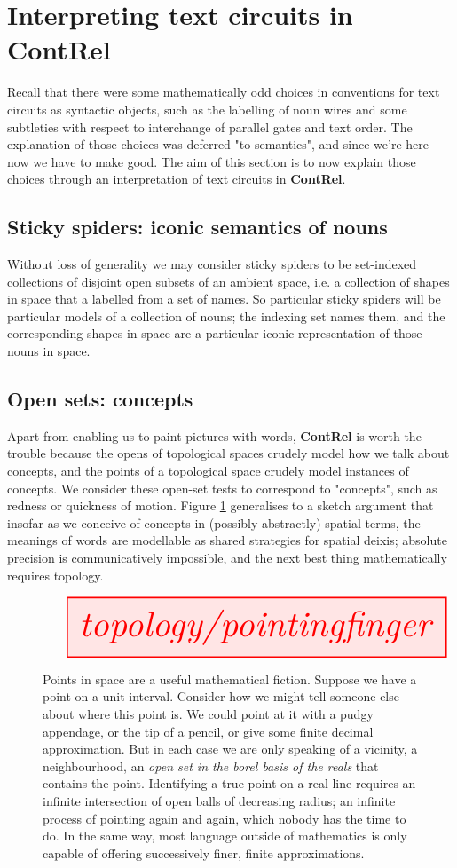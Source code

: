 \section{Interpreting text circuits in \textbf{ContRel}}\label{subsec:toptext}

Recall that there were some mathematically odd choices in conventions for text circuits as syntactic objects, such as the labelling of noun wires and some subtleties with respect to interchange of parallel gates and text order. The explanation of those choices was deferred "to semantics", and since we're here now we have to make good. The aim of this section is to now explain those choices through an interpretation of text circuits in \textbf{ContRel}.

\subsection{Sticky spiders: iconic semantics of nouns}
Without loss of generality we may consider sticky spiders to be set-indexed collections of disjoint open subsets of an ambient space, i.e. a collection of shapes in space that a labelled from a set of names. So particular sticky spiders will be particular models of a collection of nouns; the indexing set names them, and the corresponding shapes in space are a particular iconic representation of those nouns in space.

\subsection{Open sets: concepts}

Apart from enabling us to paint pictures with words, \textbf{ContRel} is worth the trouble because the opens of topological spaces crudely model how we talk about concepts, and the points of a topological space crudely model instances of concepts. We consider these open-set tests to correspond to "concepts", such as redness or quickness of motion. Figure \ref{fig:pointing} generalises to a sketch argument that insofar as we conceive of concepts in (possibly abstractly) spatial terms, the meanings of words are modellable as shared strategies for spatial deixis; absolute precision is communicatively impossible, and the next best thing mathematically requires topology.

\begin{figure}[h!]\label{fig:pointing}
\[\resizebox{\textwidth}{!}{\tikzfig{topology/pointingfinger}}\]
\caption{Points in space are a useful mathematical fiction. Suppose we have a point on a unit interval. Consider how we might tell someone else about where this point is. We could point at it with a pudgy appendage, or the tip of a pencil, or give some finite decimal approximation. But in each case we are only speaking of a vicinity, a neighbourhood, an \emph{open set in the borel basis of the reals} that contains the point. Identifying a true point on a real line requires an infinite intersection of open balls of decreasing radius; an infinite process of pointing again and again, which nobody has the time to do. In the same way, most language outside of mathematics is only capable of offering successively finer, finite approximations.}
\end{figure}

